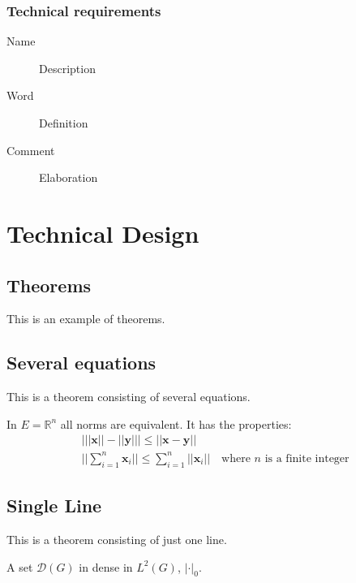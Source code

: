 \documentclass[11pt,fleqn]{book} %
\begin{document}
\subsection{Technical requirements}
\begin{description}
\item[Name] Description
\item[Word] Definition
\item[Comment] Elaboration
\end{description}


\chapter{Technical Design}

\section{Theorems}

This is an example of theorems.

\section{Several equations}
This is a theorem consisting of several equations.

\begin{theorem}
In $E=\mathbb{R}^n$ all norms are equivalent. It has the properties:
\begin{align}
& \big| ||\mathbf{x}|| - ||\mathbf{y}|| \big|\leq || \mathbf{x}- \mathbf{y}||\\
&  ||\sum_{i=1}^n\mathbf{x}_i||\leq \sum_{i=1}^n||\mathbf{x}_i||\quad\text{where $n$ is a finite integer}
\end{align}
\end{theorem}

\section{Single Line}
This is a theorem consisting of just one line.

\begin{theorem}
A set $\mathcal{D}(G)$ in dense in $L^2(G)$, $|\cdot|_0$. 
\end{theorem}
\end{document}
